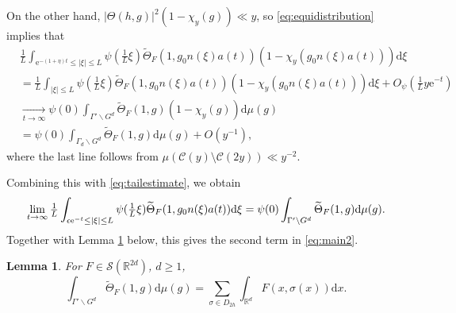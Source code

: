 \documentclass[12pt]{amsart}
\newtheorem{lem}[thm]{Lemma}
\theoremstyle{definition}
\theoremstyle{remark}
\numberwithin{equation}{section}
\newcommand{\dd}{\mathrm{d}}
\newcommand{\R}{\mathbb{R}}
\newcommand{\e}{\mathrm{e}}
\newcommand{\cC}{\mathcal{C}}
\newcommand{\cS}{\mathcal{S}}
\begin{document}
On the other hand, $|\Theta(h, g)|^2(1 - \chi_y(g)) \ll y$, so \eqref{eq:equidistribution} implies that
\begin{equation}
\begin{split}
  \label{eq:equidistribution1}
&  \tfrac{1}{L} \int_{\e^{-(1 + \eta) t} \leq |\xi| \leq L} \psi(\tfrac{1}{L} \xi) \widetilde\Theta_F(1, g_0n(\xi)a(t)) (1 - \chi_y(g_0n(\xi)a(t)))\dd \xi \\
&  = \tfrac{1}{L} \int_{|\xi| \leq L} \psi(\tfrac{1}{L} \xi) \widetilde\Theta_F(1, g_0n(\xi)a(t)) (1 - \chi_y(g_0n(\xi)a(t)))\dd \xi + O_\psi(\tfrac{1}{L}y\e^{-t})\\
&  \underset{t\to\infty}{\to} \psi(0) \int_{\Gamma' \backslash G^d} \widetilde\Theta_F(1, g) ( 1 - \chi_y(g)) \dd \mu(g) \\
&  = \psi(0) \int_{\Gamma_d \backslash G^d} \widetilde\Theta_F(1, g) \dd \mu(g) + O(y^{-1}),
\end{split}
\end{equation}
where the last line follows from $\mu(\cC(y) \setminus \cC(2y)) \ll y^{-2}$. 

Combining this with \eqref{eq:tailestimate}, we obtain
\begin{equation}
  \label{eq:ratner1}
  \lim_{t \to \infty} \tfrac{1}{L} \int_{\epsilon \e^{-t} \leq |\xi| \leq L} \psi(\tfrac{1}{L} \xi) \widetilde\Theta_F(1, g_0n(\xi)a(t)) \dd \xi \\
  = \psi(0) \int_{\Gamma' \backslash G^d} \widetilde\Theta_F(1, g) \dd\mu(g). 
\end{equation}
Together with Lemma \ref{lem:thetaint} below, this gives the second term in \eqref{eq:main2}.

\begin{lem}
  \label{lem:thetaint}
  For $F\in \cS(\R^{2d})$, $d\geq 1$,
  \begin{equation}
    \label{eq:thetaint}
    \int_{\Gamma' \backslash G^d} \widetilde\Theta_F(1, g) \dd \mu(g) = \sum_{\sigma\in D_{2h}} \int_{\R^d} F(x,\sigma(x)) \dd x.
  \end{equation}
\end{lem}
\end{document}
